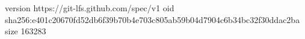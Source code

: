 version https://git-lfs.github.com/spec/v1
oid sha256:e401c20670fd52db6f39b70b4e703c805ab59b04d7904c6b34bc32f30ddac2ba
size 163283
